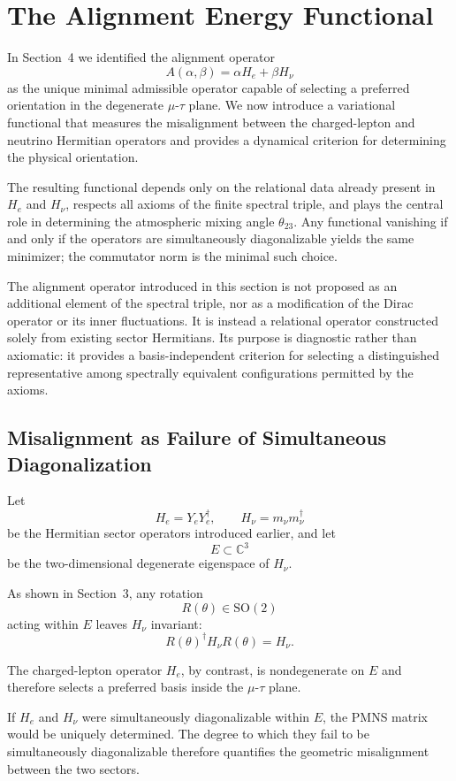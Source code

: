 \section{The Alignment Energy Functional}

In Section~4 we identified the alignment operator
\[
A(\alpha,\beta)=\alpha H_e + \beta H_\nu
\]
as the unique minimal admissible operator capable of selecting a preferred orientation in the degenerate $\mu$-$\tau$ plane. We now introduce a variational functional that measures the misalignment between the charged-lepton and neutrino Hermitian operators and provides a dynamical criterion for determining the physical orientation.

The resulting functional depends only on the relational data already present in $H_e$ and $H_\nu$, respects all axioms of the finite spectral triple, and plays the central role in determining the atmospheric mixing angle $\theta_{23}$. Any functional vanishing if and only if the operators are simultaneously diagonalizable yields the same minimizer; the commutator norm is the minimal such choice.

The alignment operator introduced in this section is not proposed as an additional element of the spectral triple, nor as a modification of the Dirac operator or its inner fluctuations. It is instead a relational operator constructed solely from existing sector Hermitians. Its purpose is diagnostic rather than axiomatic: it provides a basis-independent criterion for selecting a distinguished representative among spectrally equivalent configurations permitted by the axioms.

\subsection{Misalignment as Failure of Simultaneous Diagonalization}

Let
\[
H_e = Y_e Y_e^\dagger,\qquad
H_\nu = m_\nu m_\nu^\dagger
\]
be the Hermitian sector operators introduced earlier, and let
\[
E \subset \mathbb C^3
\]
be the two-dimensional degenerate eigenspace of $H_\nu$.

As shown in Section~3, any rotation
\[
R(\theta)\in\mathrm{SO}(2)
\]
acting within $E$ leaves $H_\nu$ invariant:
\[
R(\theta)^\dagger H_\nu R(\theta) = H_\nu.
\]

The charged-lepton operator $H_e$, by contrast, is nondegenerate on $E$ and therefore selects a preferred basis inside the $\mu$-$\tau$ plane.

If $H_e$ and $H_\nu$ were simultaneously diagonalizable within $E$, the PMNS matrix would be uniquely determined. The degree to which they fail to be simultaneously diagonalizable therefore quantifies the geometric misalignment between the two sectors.

